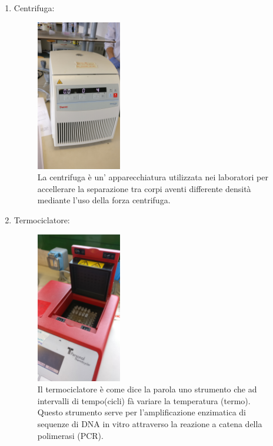 \documentclass{article}
\begin{document}
\begin{enumerate}
		\vspace{0.5cm}


		\item Centrifuga:

		\begin{figure}[H]

			\includegraphics[width=0.35\textwidth]{./immagini/centrifuga.jpg}
			\caption{La centrifuga è un' apparecchiatura utilizzata nei laboratori per accellerare la separazione tra corpi aventi differente densità mediante l'uso della forza centrifuga.}
			\label{centrifuga}

		\end{figure}

		\vspace{0.5cm}


		\item Termociclatore:

		\begin{figure}[H]

			\includegraphics[width=0.35\textwidth]{./immagini/termociclatore.jpg}
			\caption{Il termociclatore è come dice la parola uno strumento che ad intervalli di tempo(cicli) fà variare la temperatura (termo). Questo strumento serve per l'amplificazione enzimatica di sequenze di DNA in vitro attraverso la reazione a catena della polimerasi (PCR).}
			\label{termociclatore}


\end{figure}
\end{enumerate}
\end{document}
